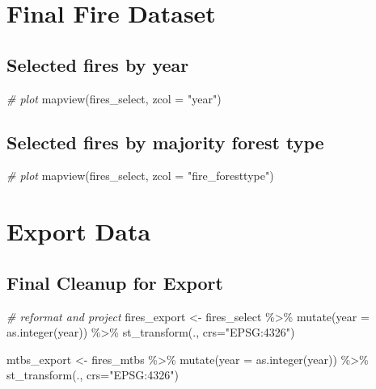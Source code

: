 \documentclass[
]{book}
\newenvironment{Shaded}{\begin{snugshade}}{\end{snugshade}}
\newcommand{\AttributeTok}[1]{\textcolor[rgb]{0.77,0.63,0.00}{#1}}
\newcommand{\CommentTok}[1]{\textcolor[rgb]{0.56,0.35,0.01}{\textit{#1}}}
\newcommand{\FunctionTok}[1]{\textcolor[rgb]{0.00,0.00,0.00}{#1}}
\newcommand{\NormalTok}[1]{#1}
\newcommand{\OtherTok}[1]{\textcolor[rgb]{0.56,0.35,0.01}{#1}}
\newcommand{\SpecialCharTok}[1]{\textcolor[rgb]{0.00,0.00,0.00}{#1}}
\newcommand{\StringTok}[1]{\textcolor[rgb]{0.31,0.60,0.02}{#1}}
\begin{document}
\hypertarget{final-fire-dataset}{%
\chapter{Final Fire Dataset}\label{final-fire-dataset}}

\hypertarget{selected-fires-by-year}{%
\section{Selected fires by year}\label{selected-fires-by-year}}

\begin{Shaded}
\begin{Highlighting}[]
\CommentTok{\# plot}
\FunctionTok{mapview}\NormalTok{(fires\_select, }\AttributeTok{zcol =} \StringTok{"year"}\NormalTok{)}
\end{Highlighting}
\end{Shaded}

\hypertarget{selected-fires-by-majority-forest-type}{%
\section{Selected fires by majority forest type}\label{selected-fires-by-majority-forest-type}}

\begin{Shaded}
\begin{Highlighting}[]
\CommentTok{\# plot}
\FunctionTok{mapview}\NormalTok{(fires\_select, }\AttributeTok{zcol =} \StringTok{"fire\_foresttype"}\NormalTok{)}
\end{Highlighting}
\end{Shaded}

\hypertarget{export-data}{%
\chapter{Export Data}\label{export-data}}

\hypertarget{final-cleanup-for-export}{%
\section{Final Cleanup for Export}\label{final-cleanup-for-export}}

\begin{Shaded}
\begin{Highlighting}[]
\CommentTok{\# reformat and project}
\NormalTok{fires\_export }\OtherTok{\textless{}{-}}\NormalTok{ fires\_select }\SpecialCharTok{\%\textgreater{}\%} 
  \FunctionTok{mutate}\NormalTok{(}\AttributeTok{year =} \FunctionTok{as.integer}\NormalTok{(year)) }\SpecialCharTok{\%\textgreater{}\%} 
  \FunctionTok{st\_transform}\NormalTok{(., }\AttributeTok{crs=}\StringTok{"EPSG:4326"}\NormalTok{)}

\NormalTok{mtbs\_export }\OtherTok{\textless{}{-}}\NormalTok{ fires\_mtbs }\SpecialCharTok{\%\textgreater{}\%} 
  \FunctionTok{mutate}\NormalTok{(}\AttributeTok{year =} \FunctionTok{as.integer}\NormalTok{(year)) }\SpecialCharTok{\%\textgreater{}\%} 
  \FunctionTok{st\_transform}\NormalTok{(., }\AttributeTok{crs=}\StringTok{"EPSG:4326"}\NormalTok{)}
\end{Highlighting}
\end{Shaded}
\end{document}
